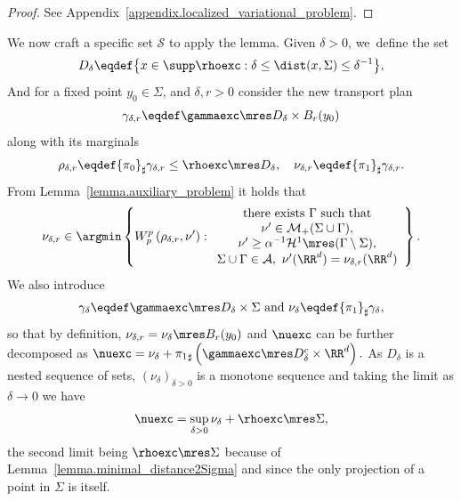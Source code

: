\begin{proof} See Appendix~\ref{appendix.localized_variational_problem}.
\end{proof}
We now craft a specific set $\mathcal{S}$ to apply the lemma.
Given $\delta>0$, we~define the
set
\begin{equation} \label{set_D_delta}
D_{\delta} \eqdef
\bigl\{
x \in \supp\rhoexc :
\delta \le \dist(x, \Sigma) \le \delta^{-1}
\bigr\},
\end{equation}
And for a fixed point $y_0 \in \Sigma$, and $\delta,r>0$ consider the new transport plan
\begin{equation}\label{gamma_delta}
\gamma_{\delta, r} \eqdef \gammaexc \mres D_{\delta}\times B_r(y_0)
\end{equation}
along with its marginals\vspace*{-3pt}
\begin{equation}\label{nu_delta}
\rho_{\delta, r} \eqdef {\pi_{0}}_\sharp\gamma_{\delta,r} \le \rhoexc \mres D_{\delta},
\quad
\nu_{\delta, r} \eqdef {\pi_{1}}_\sharp\gamma_{\delta, r}.
\end{equation}
From Lemma~\ref{lemma.auxiliary_problem} it holds that
\begin{equation}\label{auxiliary_problem}
\nu_{\delta, r}
\in
\argmin
\left\{
W_p^p\left(
\rho_{\delta, r}, \nu'
\right) :
\begin{array}{c}
\text{there exists $\Gamma$ such that}\\
\nu' \in \mathcal{M}_+(\Sigma \cup \Gamma),\\
\nu' \ge \alpha^{-1}\mathcal{H}^1\mres (\Gamma\setminus\Sigma), \\
\Sigma \cup \Gamma \in \mathcal{A}, \
\nu'(\RR^d) = \nu_{\delta, r}(\RR^d)
\end{array}
\right\}.
\end{equation}
We also introduce\vspace*{-3pt}
\begin{equation}\label{measure_nu_delta}
\gamma_\delta\eqdef\gammaexc\mres D_{\delta}\times\Sigma
\text{ and }
\nu_\delta \eqdef {\pi_1}_\sharp \gamma_\delta,
\end{equation}
so that by definition, $\nu_{\delta, r} = \nu_\delta \mres B_r(y_0)$ and $\nuexc$ can be further decomposed as
$
\nuexc = \nu_\delta + {\pi_{1}}_\sharp\left(\gammaexc \mres D_\delta^c \times \RR^d\right).
$
As $D_\delta$ is a nested sequence of sets, $(\nu_\delta)_{\delta > 0}$ is a monotone sequence and taking the limit as $\delta \to 0$ we have
\begin{equation}\label{nuexc.further_decomposition}
\nuexc = \sup_{\delta > 0} \nu_\delta + \rhoexc\mres \Sigma,
\end{equation}
the second limit being $\rhoexc\mres \Sigma$ because
of Lemma~\ref{lemma.minimal_distance2Sigma} and
since the only projection of a point in $\Sigma$ is itself.

